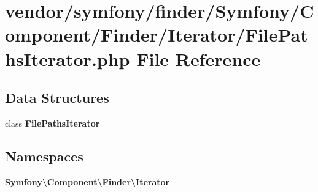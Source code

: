 \section{vendor/symfony/finder/\+Symfony/\+Component/\+Finder/\+Iterator/\+File\+Paths\+Iterator.php File Reference}
\label{_file_paths_iterator_8php}
\subsection*{Data Structures}
\begin{DoxyCompactItemize}
\item 
class {\bf File\+Paths\+Iterator}
\end{DoxyCompactItemize}
\subsection*{Namespaces}
\begin{DoxyCompactItemize}
\item 
 {\bf Symfony\textbackslash{}\+Component\textbackslash{}\+Finder\textbackslash{}\+Iterator}
\end{DoxyCompactItemize}
